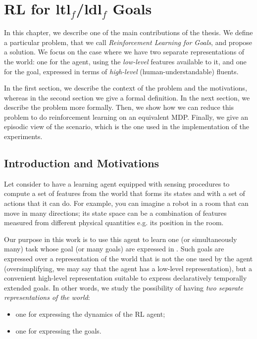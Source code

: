 \chapter{RL for {\sc ltl}$_f$/{\sc ldl}$_f$ Goals}\label{ch:rl-llf-goals}

In this chapter, we describe one of the main contributions of the thesis. We define a particular problem, that we call
\emph{Reinforcement Learning for \LLf Goals}, and propose a solution.
We focus on the case where we have two separate representations of the world: one for the agent, using the \emph{low-level} features available to it, and one for the goal, expressed in terms of \emph{high-level} (human-understandable) fluents.

In the first section, we describe the context of the problem and the motivations, whereas in the second section we give a formal definition. In the next section, we describe the problem more formally. Then, we show how we can reduce this problem to do reinforcement learning on an equivalent MDP. Finally, we give an episodic view of the scenario, which is the one used in the implementation of the experiments.

\section{Introduction and Motivations}
Let consider to have a
learning agent equipped with sensing procedures to compute
a set of features from the world that forms its states and with
a set of actions that it can do. 
For example, you can imagine a robot in a room that can move in many directions; its state space can be a combination of features measured from different physical quantities e.g. its position in the room.

Our purpose in this work is to use this agent
to learn one (or simultaneously many) task whose goal (or many goals)
are expressed in \LLf. Such goals are expressed over
a representation of the world that is not the one used by the
agent (oversimplifying, we may say that the agent has a low-level representation), but a convenient high-level representation suitable to express declaratively temporally extended goals. In other words, we study the possibility of having \emph{two
separate representations of the world}:
\begin{itemize}
	\item one for expressing the dynamics of the RL agent;
	\item one for expressing the \LLf goals.
\end{itemize}

